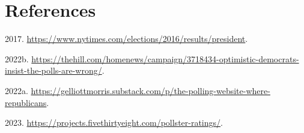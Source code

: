 \documentclass[
  12pt,
]{article}
\newlength{\cslhangindent}
\newlength{\cslentryspacingunit} %
\newenvironment{CSLReferences}[2] %
 {%
  \setlength{\parindent}{0pt}
  \ifodd #1
  \let\oldpar\par
  \def\par{\hangindent=\cslhangindent\oldpar}
  \fi
  \setlength{\parskip}{#2\cslentryspacingunit}
 }%
 {}
\begin{document}
\hypertarget{references}{%
\section*{References}\label{references}}

\hypertarget{refs}{}
\begin{CSLReferences}{1}{0}
\leavevmode{}%
2017. \url{https://www.nytimes.com/elections/2016/results/president}.

\leavevmode{}%
2022b.
\url{https://thehill.com/homenews/campaign/3718434-optimistic-democrats-insist-the-polls-are-wrong/}.

\leavevmode{}%
2022a.
\url{https://gelliottmorris.substack.com/p/the-polling-website-where-republicans}.

\leavevmode{}%
2023. \url{https://projects.fivethirtyeight.com/pollster-ratings/}.

\end{CSLReferences}
\end{document}
